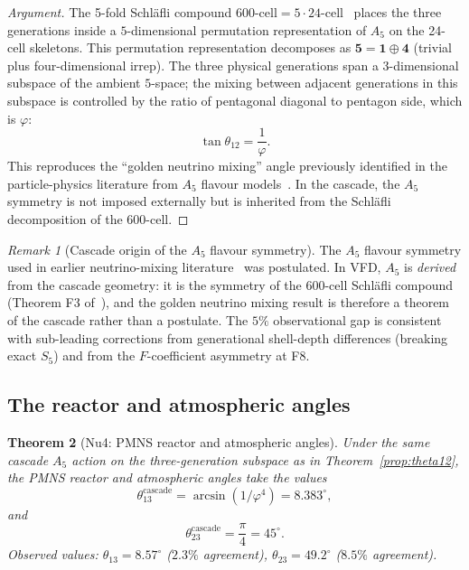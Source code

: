 \documentclass[12pt]{article}
\newtheorem{theorem}{Theorem}
\theoremstyle{definition}
\theoremstyle{remark}
\newtheorem{remark}[theorem]{Remark}
\begin{document}
\begin{proof}[Argument]
The 5-fold Schl\"afli compound $600\text{-cell} = 5 \cdot 24\text{-cell}$~\citep{SmartXXXVI} places the three generations inside a $5$-dimensional permutation representation of $A_5$ on the 24-cell skeletons. This permutation representation decomposes as $\mathbf{5} = \mathbf{1} \oplus \mathbf{4}$ (trivial plus four-dimensional irrep). The three physical generations span a 3-dimensional subspace of the ambient $5$-space; the mixing between adjacent generations in this subspace is controlled by the ratio of pentagonal diagonal to pentagon side, which is $\varphi$:
\begin{equation}
\tan\theta_{12} = \frac{1}{\varphi}.
\end{equation}
This reproduces the ``golden neutrino mixing'' angle previously identified in the particle-physics literature from $A_5$ flavour models~\citep{Rodejohann2009, Feruglio2011}. In the cascade, the $A_5$ symmetry is not imposed externally but is inherited from the Schl\"afli decomposition of the 600-cell.
\end{proof}

\begin{remark}[Cascade origin of the $A_5$ flavour symmetry]
The $A_5$ flavour symmetry used in earlier neutrino-mixing literature~\citep{Rodejohann2009, Feruglio2011} was postulated. In VFD, $A_5$ is \emph{derived} from the cascade geometry: it is the symmetry of the 600-cell Schl\"afli compound (Theorem F3 of~\citep{SmartXXXVI}), and the golden neutrino mixing result is therefore a theorem of the cascade rather than a postulate. The $5\%$ observational gap is consistent with sub-leading corrections from generational shell-depth differences (breaking exact $S_5$) and from the $F$-coefficient asymmetry at F8.
\end{remark}

\subsection{The reactor and atmospheric angles}

\begin{theorem}[Nu4: PMNS reactor and atmospheric angles]\label{prop:theta13-23}
Under the same cascade $A_5$ action on the three-generation subspace as in Theorem~\ref{prop:theta12}, the PMNS reactor and atmospheric angles take the values
\begin{equation}\label{eq:theta13}
\theta_{13}^{\mathrm{cascade}} = \arcsin(1/\varphi^4) = 8.383^\circ,
\end{equation}
and
\begin{equation}\label{eq:theta23}
\theta_{23}^{\mathrm{cascade}} = \frac{\pi}{4} = 45^\circ.
\end{equation}
Observed values: $\theta_{13} = 8.57^\circ$ ($2.3\%$ agreement), $\theta_{23} = 49.2^\circ$ ($8.5\%$ agreement).
\end{theorem}
\end{document}
